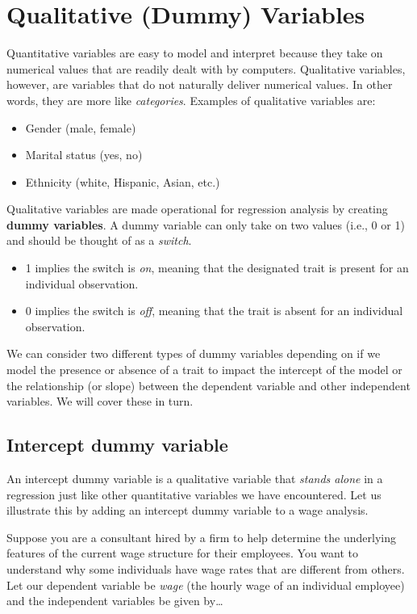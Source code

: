 \documentclass[
]{book}
\begin{document}
\chapter{Qualitative (Dummy) Variables}\label{DVS}

Quantitative variables are easy to model and interpret because they take on numerical values that are readily dealt with by computers. Qualitative variables, however, are variables that do not naturally deliver numerical values. In other words, they are more like \emph{categories}. Examples of qualitative variables are:

\begin{itemize}
\item
  Gender (male, female)
\item
  Marital status (yes, no)
\item
  Ethnicity (white, Hispanic, Asian, etc.)
\end{itemize}

Qualitative variables are made operational for regression analysis by creating \textbf{dummy variables}. A dummy variable can only take on two values (i.e., 0 or 1) and should be thought of as a \emph{switch}.

\begin{itemize}
\item
  1 implies the switch is \emph{on}, meaning that the designated trait is present for an individual observation.
\item
  0 implies the switch is \emph{off}, meaning that the trait is absent for an individual observation.
\end{itemize}

We can consider two different types of dummy variables depending on if we model the presence or absence of a trait to impact the intercept of the model or the relationship (or slope) between the dependent variable and other independent variables. We will cover these in turn.

\section{Intercept dummy variable}\label{intercept-dummy-variable}

An intercept dummy variable is a qualitative variable that \emph{stands alone} in a regression just like other quantitative variables we have encountered. Let us illustrate this by adding an intercept dummy variable to a wage analysis.

Suppose you are a consultant hired by a firm to help determine the underlying features of the current wage structure for their employees. You want to understand why some individuals have wage rates that are different from others. Let our dependent variable be \emph{wage} (the hourly wage of an individual employee) and the independent variables be given by\ldots{}
\end{document}
